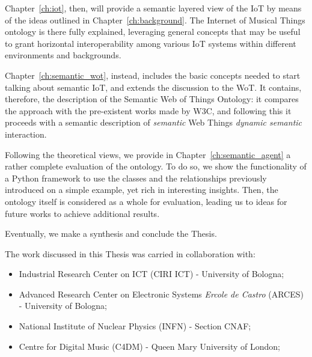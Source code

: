 \documentclass[11pt, twoside, openright]{report}   	%
\begin{document}
Chapter~\ref{ch:iot}, then, will provide a semantic layered view of the IoT by means of the ideas outlined in Chapter~\ref{ch:background}. The Internet of Musical Things ontology is there fully explained, leveraging general concepts that may be useful to grant horizontal interoperability among various IoT systems within different environments and backgrounds.

Chapter~\ref{ch:semantic_wot}, instead, includes the basic concepts needed to start talking about semantic IoT, and extends the discussion to the WoT. It contains, therefore, the description of the Semantic Web of Things Ontology: it compares the approach with the pre-existent works made by W3C, and following this it proceeds with a semantic description of \textit{semantic} Web Things \textit{dynamic semantic} interaction.

Following the theoretical views, we provide in Chapter~\ref{ch:semantic_agent} a rather complete evaluation of the ontology. To do so, we show the functionality of a Python framework to use the classes and the relationships previously introduced on a simple example, yet rich in interesting insights. Then, the ontology itself is considered as a whole for evaluation, leading us to ideas for future works to achieve additional results.

Eventually, we make a synthesis and conclude the Thesis.

The work discussed in this Thesis was carried in collaboration with:
\begin{itemize}
\item Industrial Research Center on ICT (CIRI ICT) - University of Bologna;
\item Advanced Research Center on Electronic Systems \textit{Ercole de Castro} (ARCES) - University of Bologna;
\item National Institute of Nuclear Physics (INFN) - Section CNAF;
\item Centre for Digital Music (C4DM) - Queen Mary University of London;
\end{itemize}
\end{document}
